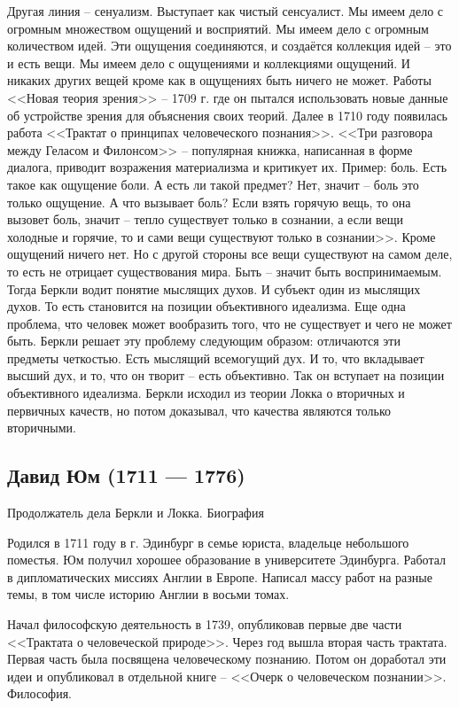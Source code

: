 Другая линия – сенуализм. Выступает как чистый сенсуалист. Мы имеем дело с огромным множеством ощущений и восприятий. Мы имеем дело с огромным количеством идей. Эти ощущения соединяются, и создаётся коллекция идей – это и есть вещи. Мы имеем дело с ощущениями и коллекциями ощущений. И никаких других вещей кроме как в ощущениях быть ничего не может. Работы <<Новая теория зрения>> – 1709 г. где он пытался использовать новые данные об устройстве зрения для объяснения своих теорий. Далее в 1710 году появилась работа <<Трактат о принципах человеческого познания>>. <<Три разговора между Геласом и Филонсом>> – популярная книжка, написанная в форме диалога, приводит возражения материализма и критикует их. Пример: боль. Есть такое как ощущение боли. А есть ли такой предмет? Нет, значит – боль это только ощущение. А что вызывает боль? Если взять горячую вещь, то она вызовет боль, значит – тепло существует только в сознании, а если вещи холодные и горячие, то и сами вещи существуют только в сознании>>. Кроме ощущений ничего нет. Но с другой стороны все вещи существуют на самом деле, то есть не отрицает существования мира. Быть – значит быть воспринимаемым. Тогда Беркли водит понятие мыслящих духов. И субъект один из мыслящих духов. То есть становится на позиции объективного идеализма. Еще одна проблема, что человек может вообразить того, что не существует и чего не может быть. Беркли решает эту проблему следующим образом: отличаются эти предметы четкостью. Есть мыслящий всемогущий дух. И то, что вкладывает высший дух, и то, что он творит – есть объективно. Так он вступает на позиции объективного идеализма. Беркли исходил из теории Локка о вторичных и первичных качеств, но потом доказывал, что качества являются только вторичными.
\subsection{Давид Юм (1711 — 1776)}

Продолжатель дела Беркли и Локка.
Биография

Родился в 1711 году в г. Эдинбург в семье юриста, владельце небольшого поместья. Юм получил хорошее образование в университете Эдинбурга. Работал в дипломатических миссиях Англии в Европе. Написал массу работ на разные темы, в том числе историю Англии в восьми томах.

Начал философскую деятельность в 1739, опубликовав первые две части <<Трактата о человеческой природе>>. Через год вышла вторая часть трактата. Первая часть была посвящена человеческому познанию. Потом он доработал эти идеи и опубликовал в отдельной книге – <<Очерк о человеческом познании>>.
Философия.

